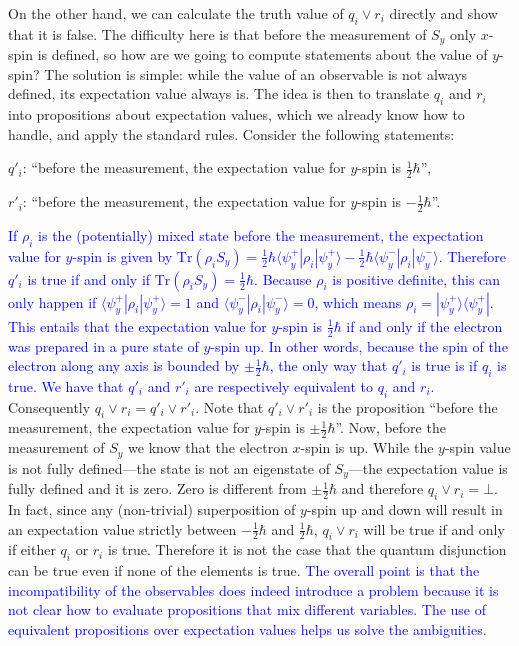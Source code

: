 \documentclass[11pt, executivepaper]{article}
\begin{document}
On the other hand, we can calculate the truth value of $q_i \vee r_i$ directly and show that it is false. The difficulty here is that before the measurement of $S_y$ only $x$-spin is defined, so how are we going to compute statements about the value of $y$-spin? The solution is simple: while the value of an observable is not always defined, its expectation value always is. The idea is then to translate $q_i$ and $r_i$ into propositions about expectation values, which we already know how to handle, and apply the standard rules. Consider the following statements:
\begin{description}
	\item $q'_i$: ``before the measurement, the expectation value for $y$-spin is $\frac{1}{2} \hbar$'',
	\item $r'_i$: ``before the measurement, the expectation value for $y$-spin is $-\frac{1}{2} \hbar$''.
\end{description}
\noindent \textcolor{blue}{If $\rho_i$ is the (potentially) mixed state before the measurement, the expectation value for $y$-spin is given by $\text{Tr}(\rho_i S_y) = \frac{1}{2} \hbar \langle \psi_y^+ | \rho_i | \psi_y^+ \rangle - \frac{1}{2} \hbar \langle \psi_y^- | \rho_i | \psi_y^- \rangle$. Therefore $q'_i$ is true if and only if $\text{Tr}(\rho_i S_y) = \frac{1}{2} \hbar$. Because $\rho_i$ is positive definite, this can only happen if $\langle \psi_y^+ | \rho_i | \psi_y^+ \rangle = 1$ and $\langle \psi_y^- | \rho_i | \psi_y^- \rangle = 0$, which means $\rho_i = | \psi_y^+ \rangle \langle \psi_y^+ |$. This entails that the expectation value for $y$-spin is $\frac{1}{2} \hbar$ if and only if the electron was prepared in a pure state of $y$-spin up. In other words, because the spin of the electron along any axis is bounded by $\pm \frac{1}{2} \hbar$, the only way that $q'_i$ is true is if $q_i$ is true. We have that $q'_i$ and $r'_i$ are respectively equivalent to $q_i$ and $r_i$.} Consequently $q_i \vee r_i = q'_i \vee r'_i$. Note that $q'_i \vee r'_i$ is the proposition ``before the measurement, the expectation value for $y$-spin is $\pm \frac{1}{2} \hbar$''. Now, before the measurement of $S_y$ we know that the electron $x$-spin is up. While the $y$-spin value is not fully defined---the state is not an eigenstate of $S_y$---the expectation value is fully defined and it is zero. Zero is different from $\pm \frac{1}{2} \hbar$ and therefore $q_i \vee r_i = \bot$. In fact, since any (non-trivial) superposition of $y$-spin up and down will result in an expectation value strictly between $-\frac{1}{2}\hbar$ and $\frac{1}{2}\hbar$, $q_i \vee r_i$ will be true if and only if either $q_i$ or $r_i$ is true. Therefore it is not the case that the quantum disjunction can be true even if none of the elements is true. \textcolor{blue}{The overall point is that the incompatibility of the observables does indeed introduce a problem because it is not clear how to evaluate propositions that mix different variables. The use of equivalent propositions over expectation values helps us solve the ambiguities.}
\end{document}
